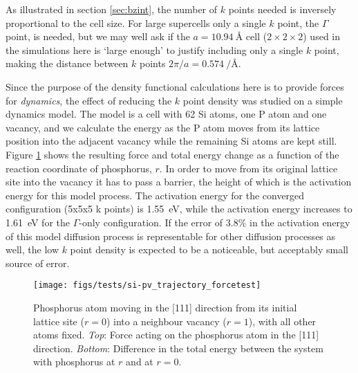 \documentclass[11pt,bibliography=totoc,index=totoc]{scrbook}   %
\newcommand{\comment}[1]{\hl{#1}}
\begin{document}

As illustrated in section \ref{sec:bzint}, the number of $k$ points needed is inversely proportional to the cell size.
For large supercells only a single $k$ point, the $\Gamma$ point, is needed, but we
may well ask if the $a=\SI{10.94}{\angstrom}$ cell ($2\times 2\times 2$) used in the simulations here is `large enough' to justify including only a single $k$ point, making the distance between $k$ points $2\pi/a = \SI{0.574}{\per\angstrom}$.%

Since the purpose of the density functional calculations here is to provide forces for \emph{dynamics},
the effect of reducing the $k$ point density was studied on a simple dynamics model.
The model is a cell with 62 Si atoms, one P atom and one vacancy, and we calculate the energy as the P atom moves from its lattice position into the adjacent vacancy while the remaining Si atoms are kept still. 
Figure \ref{fig:tests/si-pv_k} shows the resulting force and total energy change as a function of the reaction coordinate of phosphorus, $r$. 
In order to move from its original lattice site into the vacancy it has to pass a barrier, the height of which is the activation energy for this model process.
The activation energy for the converged configuration (5x5x5 k points) is 1.55~eV, while the activation energy increases to 1.61~eV for the $\Gamma$-only configuration.
If the error of 3.8\% in the activation energy of this model diffusion process is representable for other diffusion processes as well, 
the low $k$ point density is expected to be a noticeable, but acceptably small source of error.

\begin{figure}[htbp]
  \begin{center}
    \texttt{[image: figs/tests/si-pv\_trajectory\_forcetest]}
  \end{center}
  \caption{Phosphorus atom moving in the [111] direction from its initial lattice site ($r=0$) into a neighbour vacancy ($r=1$),
    with all other atoms fixed.
    \textit{Top}: Force acting on the phosphorus atom in the [111] direction. 
    \textit{Bottom}: Difference in the total energy between the system with phosphorus at $r$ and at $r=0$.
    }
    \label{fig:tests/si-pv_k}
\end{figure}
\end{document}
